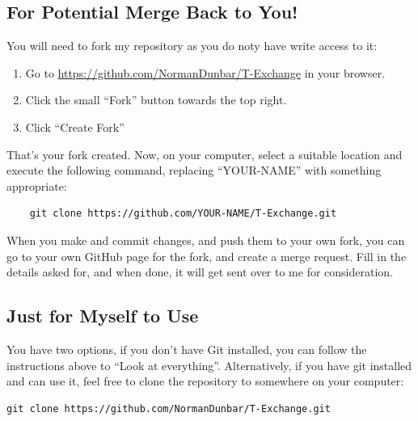\subsection{For Potential Merge Back to You!}

You will need to fork my repository as you do noty have write access to it:

\begin{enumerate}
    \item Go to \url{https://github.com/NormanDunbar/T-Exchange} in your browser.
    \item Click the small ``Fork'' button towards the top right.
    \item Click ``Create Fork''
\end{enumerate}

That's your fork created. Now, on your computer, select a suitable location and execute the following command, replacing ``YOUR-NAME'' with something appropriate:

\begin{lstlisting}
    git clone https://github.com/YOUR-NAME/T-Exchange.git
\end{lstlisting}

When you make and commit changes, and push them to your own fork, you can go to your own GitHub page for the fork, and create a merge request. Fill in the details asked for, and when done, it will get sent over to me for consideration.

\subsection{Just for Myself to Use}

You have two options, if you don't have Git installed, you can follow the instructions above to ``Look at everything''. Alternatively, if you have git installed and can use it, feel free to clone the repository to somewhere on your computer:

\begin{lstlisting}
git clone https://github.com/NormanDunbar/T-Exchange.git
\end{lstlisting}
